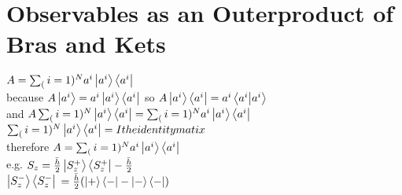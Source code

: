 \documentclass{article}
\begin{document}
\section{Observables as an Outerproduct of Bras and Kets}
$A = \sum_(i=1)^N a^i \ket{a^i} \bra{a^i}$\\
because $A \ket{a^i} = a^i \ket{a^i} \bra{a^i}$
so $A \ket{a^i} \bra{a^i} = a^i \bra{a^i} \ket{a^i}$ \\
and $A \sum_(i=1)^N \ket{a^i} \bra{a^i} = \sum_(i=1)^N a^i \ket{a^i} \bra{a^i}$ \\
$\sum_(i=1)^N \ket{a^i} \bra{a^i} = I the identity matix$ \\
therefore $A = \sum_(i=1)^N a^i \ket{a^i} \bra{a^i}$ \\
e.g. $S_z = \frac{\bar{h}}{2} \ket{S_z^+}\bra{S_z^+} - \frac{\bar{h}}{2}$ \\ $\ket{S_z^-}\bra{S_z^-}$
 $= \frac{\bar{h}}{2	}(\ket{+}\bra{-} - \ket{-}\bra{-})$
\end{document}
